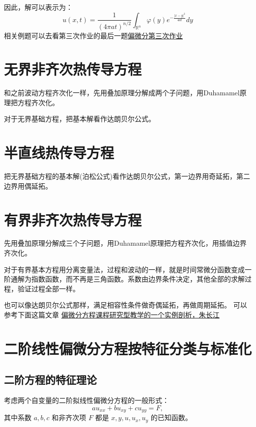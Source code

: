 \documentclass[12pt,a4paper]{article}
\numberwithin{subsection}{section}
\numberwithin{subsubsection}{subsection}
\theoremstyle{plain}
\theoremstyle{definition}
\theoremstyle{remark}
\begin{document}
	
	
	
	
	因此，解可以表示为：
	\begin{equation}
		u(x, t) = \frac{1}{(4\pi a t)^{n/2}} \int_{\mathbb{R}^n} \varphi(y) e^{-\frac{|x - y|^2}{4a t}} dy
	\end{equation}
	相关例题可以去看第三次作业的最后一题\href{https://github.com/Albert-Chen04/Partial-differential-equation}{偏微分第三次作业}
	
		\newpage
	\section{无界非齐次热传导方程}
	和之前波动方程齐次化一样，先用叠加原理分解成两个子问题，用Duhamamel原理把方程齐次化。
	
	对于无界基础方程，把基本解看作达朗贝尔公式。
	
	\section{半直线热传导方程}
	把无界基础方程的基本解(泊松公式)看作达朗贝尔公式，第一边界用奇延拓，第二边界用偶延拓。
	
	
	\section{有界非齐次热传导方程}
	先用叠加原理分解成三个子问题，用Duhamamel原理把方程齐次化，用插值边界齐次化。
	
	对于有界基本方程用分离变量法，过程和波动的一样，就是时间常微分函数变成一阶通解为指数函数，而不再是三角函数。系数由边界条件决定，其他全部的求解过程，验证过程全部一样。
	
	也可以像达朗贝尔公式那样，满足相容性条件做奇偶延拓，再做周期延拓。
	可以参考下面这篇文章
\href{https://kns.cnki.net/kcms2/article/abstract?v=VQ0ntgfwFMTzN6hnFDpFMFM9DxAtYwMQhco2QSA-IEHGx9q5EylUyfVfvJ65vLbYgxi4GKWYtrw0WYFjulce4L-QdEJiwrbko6gMtLg1u_v-yZO9l1KqPNK5VVy0WXMK_iyRkdOb_3JYM79j78dC5ZO49R0B00eT_N_tEe4_tT88MKGKuKknjw==&uniplatform=NZKPT&language=CHS}{偏微分方程课程研究型教学的一个实例剖析，朱长江}
		\newpage
	\section{二阶线性偏微分方程按特征分类与标准化}
	\subsection{二阶方程的特征理论}
	考虑两个自变量的二阶拟线性偏微分方程的一般形式：
	\begin{equation}\label{eq:quasi_linear_2nd_order}
		a u_{xx} + b u_{xy} + c u_{yy} = F,
	\end{equation}
	其中系数 \(a, b, c\) 和非齐次项 \(F\) 都是 \(x, y, u, u_x, u_y\) 的已知函数。
	
\end{document}
